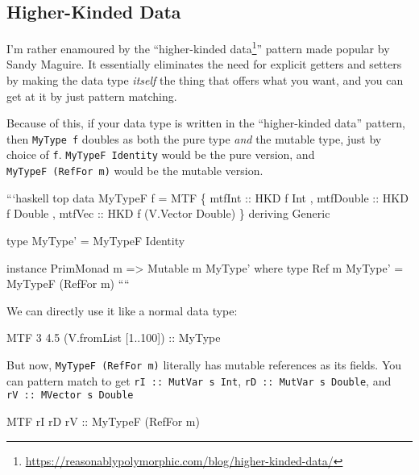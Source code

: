 \documentclass[]{article}
\newenvironment{Shaded}{}{}
\newcommand{\DataTypeTok}[1]{\textcolor[rgb]{0.56,0.13,0.00}{#1}}
\newcommand{\DecValTok}[1]{\textcolor[rgb]{0.25,0.63,0.44}{#1}}
\newcommand{\FloatTok}[1]{\textcolor[rgb]{0.25,0.63,0.44}{#1}}
\newcommand{\NormalTok}[1]{#1}
\newcommand{\OperatorTok}[1]{\textcolor[rgb]{0.40,0.40,0.40}{#1}}
\newcommand{\OtherTok}[1]{\textcolor[rgb]{0.00,0.44,0.13}{#1}}
\renewcommand{\href}[2]{#2\footnote{\url{#1}}}
\begin{document}
\hypertarget{higher-kinded-data}{%
\subsection{Higher-Kinded Data}\label{higher-kinded-data}}

I'm rather enamoured by the
``\href{https://reasonablypolymorphic.com/blog/higher-kinded-data/}{higher-kinded
data}'' pattern made popular by Sandy Maguire. It essentially eliminates the
need for explicit getters and setters by making the data type \emph{itself} the
thing that offers what you want, and you can get at it by just pattern matching.

Because of this, if your data type is written in the ``higher-kinded data''
pattern, then \texttt{MyType\ f} doubles as both the pure type \emph{and} the
mutable type, just by choice of \texttt{f}. \texttt{MyTypeF\ Identity} would be
the pure version, and \texttt{MyTypeF\ (RefFor\ m)} would be the mutable
version.

```haskell top data MyTypeF f = MTF \{ mtfInt :: HKD f Int , mtfDouble :: HKD f
Double , mtfVec :: HKD f (V.Vector Double) \} deriving Generic

type MyType' = MyTypeF Identity

instance PrimMonad m =\textgreater{} Mutable m MyType' where type Ref m MyType'
= MyTypeF (RefFor m) ````

We can directly use it like a normal data type:

\begin{Shaded}
\begin{Highlighting}[]
\DataTypeTok{MTF} \DecValTok{3} \FloatTok{4.5}\NormalTok{ (V.fromList [}\DecValTok{1}\OperatorTok{..}\DecValTok{100}\NormalTok{])}
\OtherTok{    ::} \DataTypeTok{MyType\textquotesingle{}}
\end{Highlighting}
\end{Shaded}

But now, \texttt{MyTypeF\ (RefFor\ m)} literally has mutable references as its
fields. You can pattern match to get \texttt{rI\ ::\ MutVar\ s\ Int},
\texttt{rD\ ::\ MutVar\ s\ Double}, and \texttt{rV\ ::\ MVector\ s\ Double}

\begin{Shaded}
\begin{Highlighting}[]
\DataTypeTok{MTF}\NormalTok{ rI rD}\OtherTok{ rV ::} \DataTypeTok{MyTypeF}\NormalTok{ (}\DataTypeTok{RefFor}\NormalTok{ m)}
\end{Highlighting}
\end{Shaded}
\end{document}
